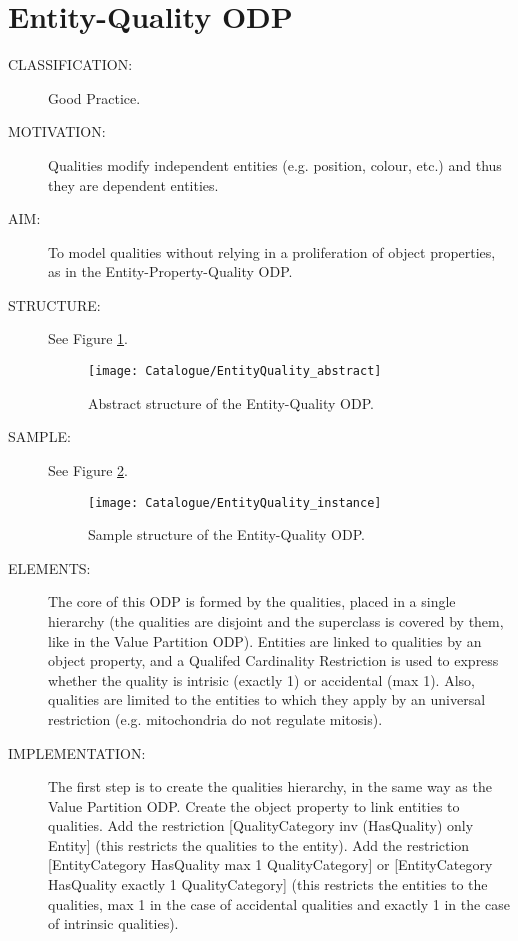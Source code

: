  \section{Entity-Quality ODP}\begin{description}
\item [CLASSIFICATION:] Good Practice.

\item [MOTIVATION:] Qualities modify independent entities (e.g. position, colour, etc.) and thus they are dependent entities.

\item [AIM:] To model qualities without relying in a proliferation of object properties, as in the Entity-Property-Quality ODP.

\item [STRUCTURE:] See Figure \ref{odp:EntityQuality_abstract}.
\begin{figure}[]\centering\texttt{[image: Catalogue/EntityQuality\_abstract]}\caption{\label{odp:EntityQuality_abstract} Abstract structure of the Entity-Quality ODP.}\end{figure}

\item [SAMPLE:] See Figure \ref{odp:EntityQuality_instance}.
\begin{figure}[]\centering\texttt{[image: Catalogue/EntityQuality\_instance]}\caption{\label{odp:EntityQuality_instance} Sample structure of the Entity-Quality ODP.}\end{figure}

\item [ELEMENTS:] The core of this ODP is formed by the qualities, placed in a single hierarchy (the qualities are disjoint and the superclass is covered by them, like in the Value Partition ODP). Entities are linked to qualities by an object property, and a Qualifed Cardinality Restriction is used to express whether the quality is intrisic (exactly 1) or accidental (max 1). Also, qualities are limited to the entities to which they apply by an universal restriction (e.g. mitochondria do not regulate mitosis).

\item [IMPLEMENTATION:] The first step is to create the qualities hierarchy, in the same way as the Value Partition ODP. Create the object property to link entities to qualities. Add the restriction [QualityCategory inv (HasQuality) only Entity] (this restricts the qualities to the entity). Add the restriction [EntityCategory HasQuality max 1 QualityCategory] or [EntityCategory HasQuality exactly 1 QualityCategory] (this restricts the entities to the qualities, max 1 in the case of accidental qualities and exactly 1 in the case of intrinsic qualities).


\end{description}

